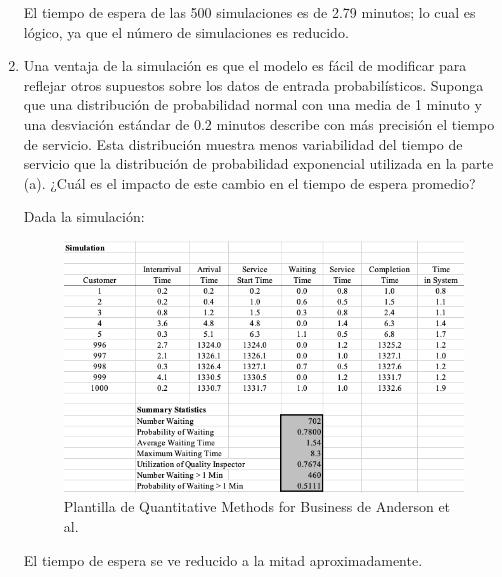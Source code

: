 \begin{problema}
\begin{enumerate}
\begin{sol}
\begin{figure}[H]
			\end{figure}
		El tiempo de espera de las 500 simulaciones es de 2.79 minutos; lo cual es lógico, ya que el número de simulaciones es reducido. 
		\end{sol}
		\item Una ventaja de la simulación es que el modelo es fácil de modificar para reflejar otros supuestos sobre los datos de entrada probabilísticos. Suponga que una distribución de probabilidad normal con una media de 1 minuto y una desviación estándar de $0.2$ minutos describe con más precisión el tiempo de servicio. Esta distribución muestra menos variabilidad del tiempo de servicio que la distribución de probabilidad exponencial utilizada en la parte (a). ¿Cuál es el impacto de este cambio en el tiempo de espera promedio?
		\begin{sol}
			Dada la simulación: 
			\begin{figure}[H]
				\centering
				\includegraphics[scale=0.5]{Images/2.2}
				\caption{Plantilla de Quantitative Methods for Business de Anderson et al. }
			\end{figure}
		El tiempo de espera se ve reducido a la mitad aproximadamente. 
		\end{sol}
	\end{enumerate}
	
\end{problema}

